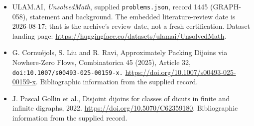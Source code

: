 \documentclass[11pt,a4paper]{article}
\begin{document}
{\small

\begin{itemize}

\item[\hypertarget{source:1445:1}{S1}] ULAM.AI, \emph{UnsolvedMath}, supplied \texttt{problems.json}, record 1445 (GRAPH-058), statement and background. The embedded literature-review date is 2026-08-17; that is the archive’s review date, not a fresh certification. Dataset landing page: \url{https://huggingface.co/datasets/ulamai/UnsolvedMath}.

\item[\hypertarget{source:1445:2}{S2}] G. Cornuéjols, S. Liu and R. Ravi, Approximately Packing Dijoins via Nowhere-Zero Flows, Combinatorica 45 (2025), Article 32, \nolinkurl{doi:10.1007/s00493-025-00159-x.} \url{https://doi.org/10.1007/s00493-025-00159-x}. Bibliographic information from the supplied record.

\item[\hypertarget{source:1445:3}{S3}] J. Pascal Gollin et al., Disjoint dijoins for classes of dicuts in finite and infinite digraphs, 2022. \url{https://doi.org/10.5070/C62359180}. Bibliographic information from the supplied record.

\end{itemize}

}

\label{end:1445}
\end{document}
